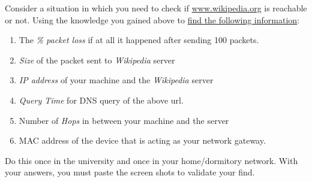 \documentclass{WeSTassignment}
\begin{document}
Consider a situation in which you need to check if \url{www.wikipedia.org} is reachable or not. Using the knowledge you gained above to \underline{find the following information}:
\begin{enumerate}
\itemsep0em
\item The \emph{\% packet loss} if at all it happened after sending 100 packets. 
\item \emph{Size} of the packet sent to \emph{Wikipedia} server
\item \emph{IP address} of your machine and the \emph{Wikipedia} server
\item \emph{Query Time} for DNS query of the above url.
\item Number of \emph{Hops} in between your machine and the server
\item MAC address of the device that is acting as your network gateway. 
\end{enumerate}

Do this once in the university and once in your home/dormitory network. With your answers, you must paste the screen shots to validate your find.
\end{document}
